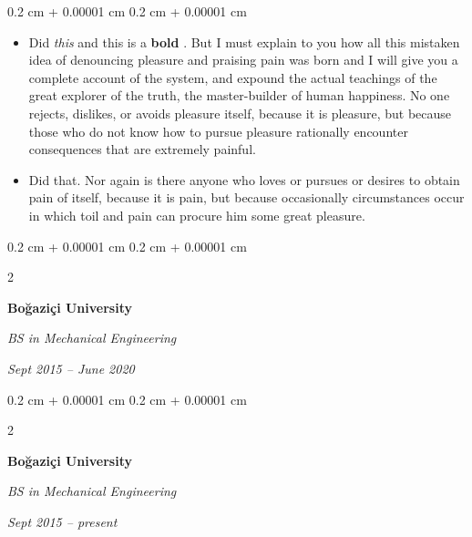 \documentclass[10pt, letterpaper]{article}
\newenvironment{highlights}{
    \begin{itemize}[
        topsep=0.10 cm,
        parsep=0.10 cm,
        partopsep=0pt,
        itemsep=0pt,
        leftmargin=0.4 cm + 10pt
    ]
}{
    \end{itemize}
} %
\newenvironment{onecolentry}{
    \begin{adjustwidth}{
        0.2 cm + 0.00001 cm
    }{
        0.2 cm + 0.00001 cm
    }
}{
    \end{adjustwidth}
} %
\newenvironment{twocolentry}[2][]{
    \onecolentry
    \def\secondColumn{#2}
    \setcolumnwidth{\fill, 4.5 cm}
    \begin{paracol}{2}
}{
    \switchcolumn \raggedleft \secondColumn
    \end{paracol}
    \endonecolentry
} %
\let\hrefWithoutArrow\href
\renewcommand{\href}[2]{\hrefWithoutArrow{#1}{\ifthenelse{\equal{#2}{}}{ }{#2 }\raisebox{.15ex}{\footnotesize \faExternalLink*}}}
\begin{document}
        \vspace{0.10 cm}
        \begin{onecolentry}
            \begin{highlights}
                \item Did \textit{this} and this is a \textbf{bold} \href{https://example.com}{link}. But I must explain to you how all this mistaken idea of denouncing pleasure and praising pain was born and I will give you a complete account of the system, and expound the actual teachings of the great explorer of the truth, the master-builder of human happiness. No one rejects, dislikes, or avoids pleasure itself, because it is pleasure, but because those who do not know how to pursue pleasure rationally encounter consequences that are extremely painful.
                \item Did that. Nor again is there anyone who loves or pursues or desires to obtain pain of itself, because it is pain, but because occasionally circumstances occur in which toil and pain can procure him some great pleasure.
            \end{highlights}
        \end{onecolentry}


        \vspace{0.2 cm}

        \begin{twocolentry}{
            
            
        \textit{Sept 2015 – June 2020}}
            \textbf{Boğaziçi University}

            \textit{BS in Mechanical Engineering}
        \end{twocolentry}



        \vspace{0.2 cm}

        \begin{twocolentry}{
            
            
        \textit{Sept 2015 – present}}
            \textbf{Boğaziçi University}

            \textit{BS in Mechanical Engineering}
        \end{twocolentry}
\end{document}
